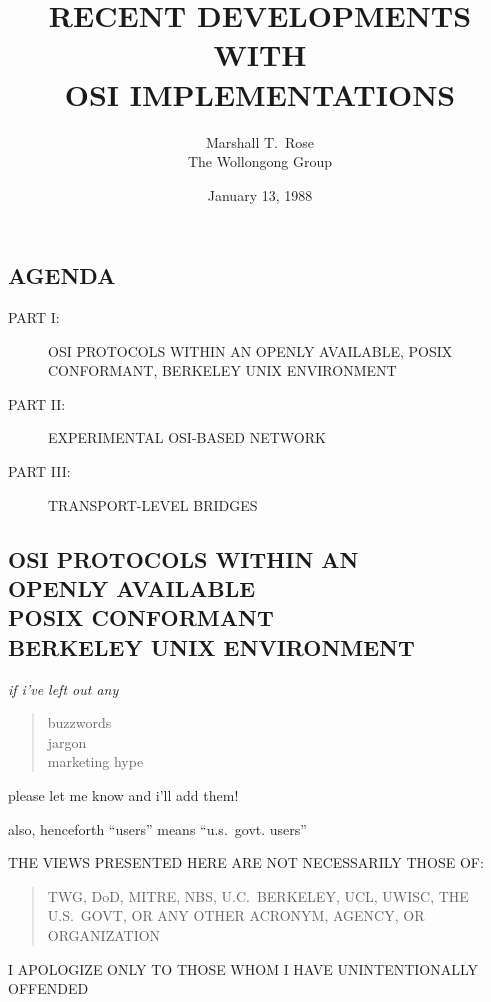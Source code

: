 

 

\raggedright



\title	{RECENT DEVELOPMENTS WITH\\ OSI IMPLEMENTATIONS}
\author	{Marshall T.~Rose\\The Wollongong Group}
\date	{January 13, 1988}
\maketitlepage


\begin{bwslide}
\part*	{AGENDA}\bf

\begin{description}
\item[PART I:]	OSI PROTOCOLS WITHIN AN OPENLY AVAILABLE, POSIX CONFORMANT,
		BERKELEY UNIX ENVIRONMENT

\item[PART II:]	EXPERIMENTAL OSI-BASED NETWORK

\item[PART III:]TRANSPORT-LEVEL BRIDGES
\end{description}
\end{bwslide}


\begin{bwslide}
\part	{OSI PROTOCOLS WITHIN AN\\
	OPENLY AVAILABLE\\ POSIX CONFORMANT\\ BERKELEY UNIX ENVIRONMENT}
\end{bwslide}


\begin{note}\em
if i've left out any 
\begin{quote}
buzzwords\\
jargon\\
marketing hype\\
\end{quote}
please let me know and i'll add them!

also, henceforth ``users'' means ``u.s.~govt. users''
\end{note}


\begin{bwslide}

\begin{nrtc}
\item	THE VIEWS PRESENTED HERE ARE NOT NECESSARILY THOSE OF:
\begin{quote}
TWG, DoD, MITRE, NBS, U.C.~BERKELEY, UCL, UWISC, THE U.S.~GOVT,
OR ANY OTHER ACRONYM, AGENCY, OR ORGANIZATION
\end{quote}

\item	I APOLOGIZE ONLY TO THOSE WHOM I HAVE UNINTENTIONALLY OFFENDED
\end{nrtc}
\end{bwslide}


